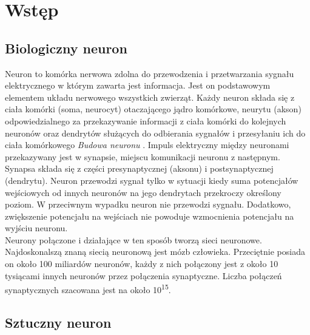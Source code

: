 
\chapter{Wstęp}

\section{Biologiczny neuron}

Neuron to komórka nerwowa zdolna do przewodzenia i przetwarzania sygnału
elektrycznego w którym zawarta jest informacja. Jest on podstawowym elementem
układu nerwowego wszystkich zwierząt. Każdy neuron składa się z
ciała komórki (soma, neurocyt) otaczającego jądro komórkowe, neurytu (akson)
odpowiedzialnego za przekazywanie informacji z ciała komórki do kolejnych neuronów
oraz dendrytów służących do odbierania sygnałów i przesyłaniu ich do ciała
komórkowego \textit{Budowa neuronu} \cite{CS231n, NNbiology}.
Impuls elektryczny między neuronami przekazywany jest
w synapsie, miejscu komunikacji neuronu z następnym. Synapsa składa się
z części presynaptycznej (aksonu) i postsynaptycznej (dendrytu). Neuron
przewodzi sygnał tylko w sytuacji kiedy suma potencjałów wejściowych od innych
neuronów na jego dendrytach przekroczy określony poziom. W przeciwnym wypadku
neuron nie przewodzi sygnału. Dodatkowo, zwiększenie potencjału na wejściach
nie powoduje wzmocnienia potencjału na wyjściu neuronu.\\
Neurony połączone i działające w ten sposób tworzą sieci neuronowe. Najdoskonalszą
znaną siecią neuronową jest mózb człowieka. Przeciętnie posiada on około 100
miliardów neuronów, każdy z nich połączony jest z około 10 tysiącami innych
neuronów przez połączenia synaptyczne. Liczba połączeń synaptycznych szacowana
jest na około 10\textsuperscript{15}.

\section{Sztuczny neuron}

